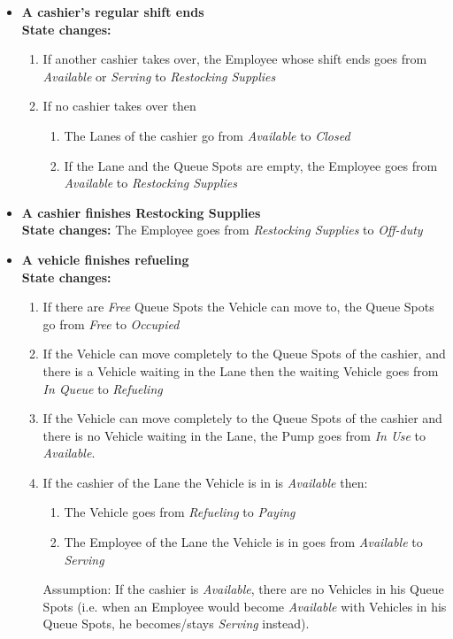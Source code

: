\begin{itemize}
\item \textbf{A cashier's regular shift ends}\\
\textbf{State changes:}
\begin{enumerate}
\item If another cashier takes over, the Employee whose shift ends goes from \textit{Available} or \textit{Serving} to \textit{Restocking Supplies}
\item If no cashier takes over then
\begin{enumerate}
\item The Lanes of the cashier go from \textit{Available} to \textit{Closed}
\item If the Lane and the Queue Spots are empty, the Employee goes from \textit{Available} to \textit{Restocking Supplies}
\end{enumerate}
\end{enumerate}
\item \textbf{A cashier finishes Restocking Supplies}\\
\textbf{State changes:}
The Employee goes from \textit{Restocking Supplies} to \textit{Off-duty}
\item \textbf{A vehicle finishes refueling}\\
\textbf{State changes:}
\begin{enumerate}
\item If there are \textit{Free} Queue Spots the Vehicle can move to, the Queue Spots go from \textit{Free} to \textit{Occupied}
\item If the Vehicle can move completely to the Queue Spots of the cashier, and there is a Vehicle waiting in the Lane then the waiting Vehicle goes from \textit{In Queue} to \textit{Refueling}
\item If the Vehicle can move completely to the Queue Spots of the cashier and there is no Vehicle waiting in the Lane, the Pump goes from \textit{In Use} to \textit{Available}.
\item If the cashier of the Lane the Vehicle is in is \textit{Available} then:
\begin{enumerate}
\item The Vehicle goes from \textit{Refueling} to \textit{Paying}
\item The Employee of the Lane the Vehicle is in goes from \textit{Available} to \textit{Serving}
\end{enumerate}
Assumption: If the cashier is \textit{Available}, there are no Vehicles in his Queue Spots (i.e. when an Employee would become \textit{Available} with Vehicles in his Queue Spots, he becomes/stays \textit{Serving} instead).

\end{enumerate}
\end{itemize}
